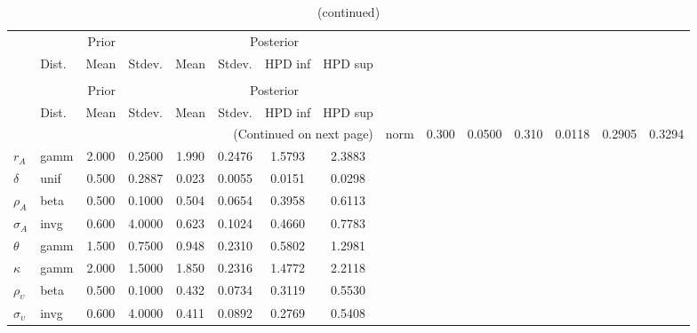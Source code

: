  
\begin{center}
\begin{longtable}{llcccccc} 
\caption{Results from Metropolis-Hastings (parameters)}
 \label{Table:MHPosterior:1}\\
\toprule 
  & \multicolumn{3}{c}{Prior}  &  \multicolumn{4}{c}{Posterior} \\
  \cmidrule(r{.75em}){2-4} \cmidrule(r{.75em}){5-8}
  & Dist. & Mean  & Stdev. & Mean & Stdev. & HPD inf & HPD sup\\
\midrule \endfirsthead 
\caption{(continued)}\\\toprule 
  & \multicolumn{3}{c}{Prior}  &  \multicolumn{4}{c}{Posterior} \\
  \cmidrule(r{.75em}){2-4} \cmidrule(r{.75em}){5-8}
  & Dist. & Mean  & Stdev. & Mean & Stdev. & HPD inf & HPD sup\\
\midrule \endhead 
\bottomrule \multicolumn{8}{r}{(Continued on next page)} \endfoot 
\bottomrule \endlastfoot 
${\alpha}$ & norm &   0.300 & 0.0500 &   0.310& 0.0118 &  0.2905 &  0.3294 \\ 
${r_{A}}$ & gamm &   2.000 & 0.2500 &   1.990& 0.2476 &  1.5793 &  2.3883 \\ 
${\delta}$ & unif &   0.500 & 0.2887 &   0.023& 0.0055 &  0.0151 &  0.0298 \\ 
${\rho_A}$ & beta &   0.500 & 0.1000 &   0.504& 0.0654 &  0.3958 &  0.6113 \\ 
${\sigma_A}$ & invg &   0.600 & 4.0000 &   0.623& 0.1024 &  0.4660 &  0.7783 \\ 
${\theta}$ & gamm &   1.500 & 0.7500 &   0.948& 0.2310 &  0.5802 &  1.2981 \\ 
${\kappa}$ & gamm &   2.000 & 1.5000 &   1.850& 0.2316 &  1.4772 &  2.2118 \\ 
${\rho_\upsilon}$ & beta &   0.500 & 0.1000 &   0.432& 0.0734 &  0.3119 &  0.5530 \\ 
${\sigma_\upsilon}$ & invg &   0.600 & 4.0000 &   0.411& 0.0892 &  0.2769 &  0.5408 \\ 
\end{longtable}
 \end{center}
